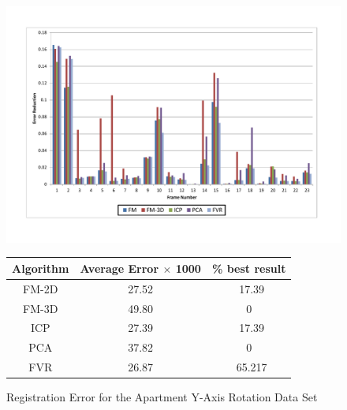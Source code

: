 \begin{figure}
\centering
\includegraphics[width=6in]{images/results/Apartment_Texture_Rotate}
\caption{Registration Error for the Apartment Y-Axis Rotation Data Set}
\label{fig:PET0}

\begin{tabular}{ccc}
\hline
\textbf{Algorithm} & \textbf{Average Error $\times$ 1000} & \textbf{\% best result}\\ \hline
FM-2D	& 27.52 & ~17.39\\
FM-3D	& 49.80 & 0\\
ICP		& 27.39 & ~17.39\\
PCA		& 37.82 & 0\\
FVR		& 26.87 & ~65.217\\
\end{tabular}
\label{tab:PET0ST}
\end{figure} 

